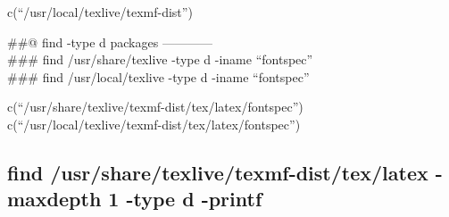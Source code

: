 \documentclass[
]{article}
\newenvironment{Shaded}{\begin{snugshade}}{\end{snugshade}}
\newcommand{\AttributeTok}[1]{\textcolor[rgb]{0.13,0.29,0.53}{#1}}
\newcommand{\ConstantTok}[1]{\textcolor[rgb]{0.56,0.35,0.01}{#1}}
\newcommand{\ControlFlowTok}[1]{\textcolor[rgb]{0.13,0.29,0.53}{\textbf{#1}}}
\newcommand{\DecValTok}[1]{\textcolor[rgb]{0.00,0.00,0.81}{#1}}
\newcommand{\FunctionTok}[1]{\textcolor[rgb]{0.13,0.29,0.53}{\textbf{#1}}}
\newcommand{\NormalTok}[1]{#1}
\newcommand{\SpecialCharTok}[1]{\textcolor[rgb]{0.81,0.36,0.00}{\textbf{#1}}}
\newcommand{\StringTok}[1]{\textcolor[rgb]{0.31,0.60,0.02}{#1}}
\begin{document}
c(``/usr/local/texlive/texmf-dist'')

\#\#@ find -type d packages ------------\\
\#\#\# find /usr/share/texlive -type d -iname ``fontspec''\\
\#\#\# find /usr/local/texlive -type d -iname ``fontspec''

\begin{Shaded}
\end{Shaded}

\begin{Shaded}
\end{Shaded}

c(``/usr/share/texlive/texmf-dist/tex/latex/fontspec'')
c(``/usr/local/texlive/texmf-dist/tex/latex/fontspec'')

\hypertarget{find-usrsharetexlivetexmf-disttexlatex--maxdepth-1--type-d--printf}{%
\subsection{find /usr/share/texlive/texmf-dist/tex/latex -maxdepth 1
-type d
-printf}\label{find-usrsharetexlivetexmf-disttexlatex--maxdepth-1--type-d--printf}}
\end{document}
